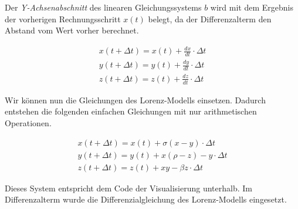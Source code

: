 Der \textit{Y-Achsenabschnitt} des linearen Gleichungssystems $ b $ wird mit dem Ergebnis der vorherigen Rechnungsschritt $ x(t) $ belegt, da der Differenzalterm den Abstand vom Wert vorher berechnet.

\begin{align}
    x(t+ \Delta t) = x(t) + \frac{dx}{dt} \cdot \Delta t\\
    y(t + \Delta t) = y(t) + \frac{dy}{dt} \cdot \Delta t\\
    z(t + \Delta t) = z(t) + \frac{dz}{dt} \cdot \Delta t
\end{align}

Wir können nun die Gleichungen des Lorenz-Modells einsetzen. Dadurch entstehen die folgenden einfachen Gleichungen mit nur arithmetischen Operationen.

\begin{align}
    x(t + \Delta t) = x(t) + \sigma(x - y) \cdot \Delta t\\
    y(t + \Delta t) = y(t) + x(\rho - z) - y \cdot \Delta t\\
    z(t + \Delta t) = z(t) + xy - \beta z \cdot \Delta t
\end{align}

Dieses System entspricht dem Code der Visualisierung unterhalb. Im Differenzalterm wurde die Differenzialgleichung des Lorenz-Modells eingesetzt.
